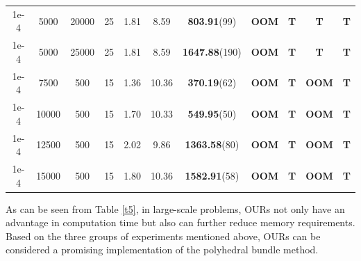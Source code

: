 \documentclass{jcmlatex}
\begin{document}
\begin{table}
\begin{tabular*}{\textwidth}{@{\extracolsep\fill}ccccccccccc}
    1e-4 & 5000&20000 &25&1.81 &8.59  &\textbf{803.91}(99) &\textbf{OOM} &\textbf{T} &\textbf{T} &\textbf{T} \\
    1e-4 & 5000&25000 &25&1.81 &8.59  &\textbf{1647.88}(190) &\textbf{OOM} &\textbf{T} &\textbf{T} &\textbf{T} \\
\midrule
    1e-4 & 7500&500 &15&1.36 &10.36  &\textbf{370.19}(62) &\textbf{OOM}  &\textbf{T} &\textbf{OOM}&\textbf{T}\\
    1e-4 & 10000&500 &15&1.70 &10.33  &\textbf{549.95}(50) &\textbf{OOM}  &\textbf{T} &\textbf{OOM}&\textbf{T}\\ 
    1e-4 & 12500&500 &15&2.02 &9.86  &\textbf{1363.58}(80) &\textbf{OOM}  &\textbf{T} &\textbf{OOM}&\textbf{T}\\
    1e-4 & 15000&500 &15&1.80 &10.36  &\textbf{1582.91}(58)&\textbf{OOM}&\textbf{T} &\textbf{OOM}&\textbf{T}\\
\hline
\end{tabular*}
\end{table}

As can be seen from Table \ref{t5}, in large-scale problems, OURs not only have an advantage in computation time but also can further reduce memory requirements. Based on the three groups of experiments mentioned above, OURs can be considered a promising implementation of the polyhedral bundle method.
\end{document}
